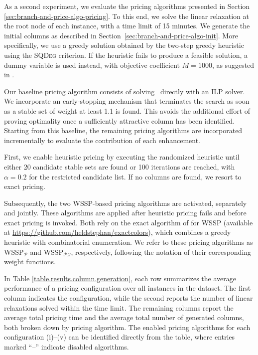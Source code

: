 \documentclass[preprint, 11pt, authoryear]{elsarticle}
\newcommand{\PP}{{\mathcal P}}
\newcommand{\QQ}{{\mathcal Q}}
\newcommand{\pricingform}{\text{DPCP-PRI}}
\begin{document}
As a second experiment, we evaluate the pricing algorithms presented in Section \ref{sec:branch-and-price-algo-pricing}. 
To this end, we solve the linear relaxation at the root node of each instance, with a time limit of 15 minutes.
We generate the initial columns as described in Section~\ref{sec:branch-and-price-algo-init}.
More specifically, we use a greedy solution obtained by the two-step greedy heuristic using the \textsc{SQDeg} criterion. 
If the heuristic fails to produce a feasible solution, a dummy variable is used instead, with objective coefficient $M=1000$, as suggested in \cite{Lucci2024}.

Our baseline pricing algorithm consists of solving \pricingform\ directly with an ILP solver.
We incorporate an early-stopping mechanism that terminates the search as soon as a stable set of weight at least 1.1 is found.
This avoids the additional effort of proving optimality once a sufficiently attractive column has been identified. 
Starting from this baseline, the remaining pricing algorithms are incorporated incrementally to evaluate the contribution of each enhancement.

First, we enable heuristic pricing by executing the randomized heuristic until either 20 candidate stable sets are found or 100 iterations are reached, with $\alpha=0.2$ for the restricted candidate list. 
If no columns are found, we resort to exact pricing.

Subsequently, the two WSSP-based pricing algorithms are activated, separately and jointly. These algorithms are applied after heuristic pricing fails and before exact pricing is invoked. 
Both rely on the exact algorithm of \cite{Held2012} for WSSP (available at \url{https://github.com/heldstephan/exactcolors}), which combines a greedy heuristic with combinatorial enumeration.
We refer to these pricing algorithms as WSSP$_{\PP}$ and WSSP$_{\PP\QQ}$, respectively, following the notation of their corresponding weight functions.

In Table \ref{table.results.column.generation}, each row summarizes the average performance of a pricing configuration over all instances in the dataset. 
The first column indicates the configuration, while the second reports the number of linear relaxations solved within the time limit. 
The remaining columns report the average total pricing time and the average total number of generated columns, both broken down by pricing algorithm.
The enabled pricing algorithms for each configuration (i)–(v) can be identified directly from the table, where entries marked ``--'' indicate disabled algorithms.
\end{document}
